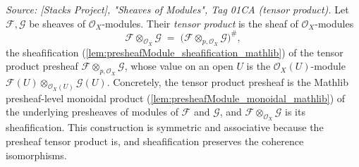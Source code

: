 \begin{definition}
  \label{def:sheafTensorObj}
  \textit{Source: [Stacks Project], "Sheaves of Modules", Tag 01CA (tensor
  product).}
  Let \(\mathcal{F}, \mathcal{G}\) be sheaves of \(\mathcal{O}_X\)-modules. Their
  \emph{tensor product} is the sheaf of \(\mathcal{O}_X\)-modules
  \[
    \mathcal{F} \otimes_{\mathcal{O}_X} \mathcal{G}
      \;=\; \bigl(\mathcal{F} \otimes_{p,\mathcal{O}_X} \mathcal{G}\bigr)^{\#},
  \]
  the sheafification (\cref{lem:presheafModule_sheafification_mathlib}) of the
  tensor product presheaf \(\mathcal{F} \otimes_{p,\mathcal{O}_X} \mathcal{G}\),
  whose value on an open \(U\) is the \(\mathcal{O}_X(U)\)-module
  \(\mathcal{F}(U) \otimes_{\mathcal{O}_X(U)} \mathcal{G}(U)\). Concretely, the
  tensor product presheaf is the Mathlib presheaf-level monoidal product
  (\cref{lem:presheafModule_monoidal_mathlib}) of the underlying presheaves of
  modules of \(\mathcal{F}\) and \(\mathcal{G}\), and
  \(\mathcal{F} \otimes_{\mathcal{O}_X} \mathcal{G}\) is its sheafification. This
  construction is symmetric and associative because the presheaf tensor product
  is, and sheafification preserves the coherence isomorphisms.
\end{definition}

